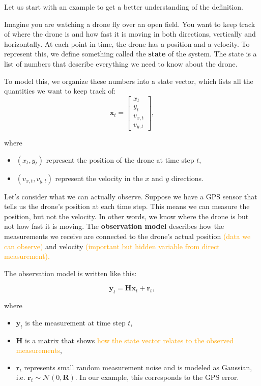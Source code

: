 \noindent Let us start with an example to get a better understanding of the definition.
\begin{example}
Imagine you are watching a drone fly over an open field. You want to keep track of where the drone is and how fast it is moving in both directions, vertically and horizontally. At each point in time, the drone has a position and a velocity. To represent this, we define something called the \textbf{state} of the system. The state is a list of numbers that describe everything we need to know about the drone.

To model this, we organize these numbers into a state vector, which lists all the quantities we want to keep track of: 
\[ \mathbf{x}_t = \begin{bmatrix}
    x_t \\ y_t \\ v_{x,t} \\ v_{y,t}
\end{bmatrix},\]

where
\begin{itemize}
    \item $(x_t,y_t)$ represent the position of the drone at time step $t$,
    \item $(v_{x,t},v_{y,t})$ represent the velocity in the $x$ and $y$ directions. 
\end{itemize}


\medskip
Let's consider what we can actually observe. Suppose we have a GPS sensor that tells us the drone's position at each time step. This means we can measure the position, but not the velocity. In other words, we know where the drone is but not how fast it is moving. The \textbf{observation model} describes how the measurements we receive are connected to the drone's actual position \textcolor{orange}{(data we can observe)} and velocity \textcolor{orange}{(important but hidden variable from direct measurement).} 

The observation model is written like this: 

\begin{equation}\label{eq: observation model}
\textbf{y}_t = \textbf{H}\textbf{x}_{t}+\textbf{r}_{t},   
\end{equation}

where 
\begin{itemize}
    \item $\textbf{y}_t$ is the measurement at time step $t$,
    \item $\textbf{H}$ is a matrix that shows \textcolor{orange}{how the state vector relates to the observed measurements},
    \item $\mathbf{r}_t$ represents small random measurement noise and is modeled as Gaussian, i.e. $\mathbf{r}_t \sim \mathcal{N}(0, \mathbf{R})$. In our example, this corresponds to the GPS error. 
\end{itemize}


\end{example}
